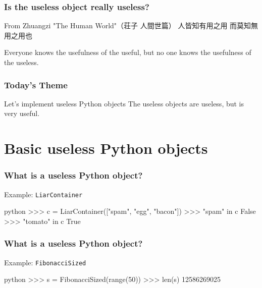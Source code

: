 \documentclass[aspectratio=169,dvipdfmx,12pt,notheorems]{beamer}
\theoremstyle{definition}
\begin{document}
\begin{frame}\frametitle{Is the useless object really useless?}

\begin{block}{From Zhuangzi "The Human World"（荘子 人間世篇）}
人皆知有用之用 而莫知無用之用也
\end{block}
Everyone knows the usefulness of the useful, but no one knows the usefulness of the useless.

\end{frame}

\begin{frame}\frametitle{Today's Theme}

\begin{block}{Let's implement useless Python objects}
The useless objects are useless, but  is very useful.
\end{block}
\end{frame}

\section{Basic useless Python objects}

\begin{frame}[fragile]\frametitle{What is a useless Python object?}

\begin{exampleblock}{Example: \texttt{LiarContainer}}
\begin{pygments}{python}
>>> c = LiarContainer(["spam", "egg", "bacon"])
>>> "spam" in c
False
>>> "tomato" in c
True
\end{pygments}
\end{exampleblock}

\end{frame}
\begin{frame}[fragile]\frametitle{What is a useless Python object?}

\begin{exampleblock}{Example: \texttt{FibonacciSized}}
\begin{pygments}{python}
>>> s = FibonacciSized(range(50))
>>> len(s)
12586269025
\end{pygments}
\end{exampleblock}

\end{frame}
\end{document}
